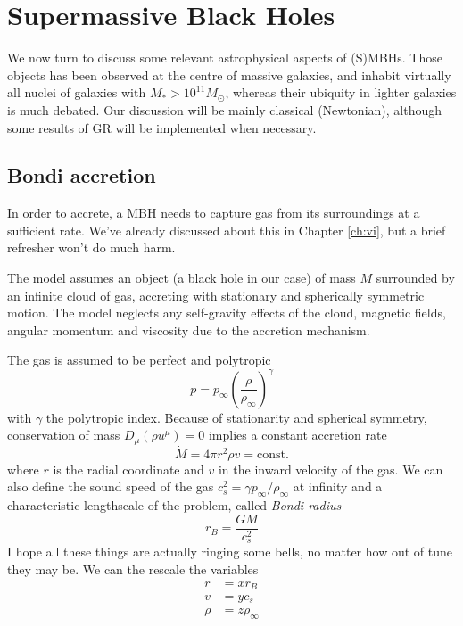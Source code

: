\section{Supermassive Black Holes}
We now turn to discuss some relevant astrophysical aspects of (S)MBHs. Those objects has been observed at the centre of massive galaxies, and inhabit virtually all nuclei of galaxies with $M_{*} > 10^{11}M_{\odot}$, whereas their ubiquity in lighter galaxies is much debated. Our discussion will be mainly classical (Newtonian), although some results of GR will be implemented when necessary.
\subsection{Bondi accretion}
In order to accrete, a MBH needs to capture gas from its surroundings at a suﬃcient rate. We've already discussed about this in Chapter \ref{ch:vi}, but a brief refresher won't do much harm.
\par The model assumes an object (a black hole in our case) of mass $M$ surrounded by an inﬁnite cloud of gas, accreting with stationary and spherically
symmetric motion. The model neglects any self-gravity eﬀects of the cloud, magnetic ﬁelds, angular momentum and viscosity due to the accretion mechanism.
\par The gas is assumed to be perfect and polytropic
\begin{equation*}
    p = p_{\infty}\left(\frac{\rho}{\rho_{\infty}}\right)^{\gamma}
\end{equation*}
with $\gamma$ the polytropic index. Because of stationarity and spherical symmetry, conservation of mass $D_{\mu}(\rho u^{\mu}) = 0$ implies a constant accretion rate
\begin{equation*}
    \dot{M} = 4\pi r^{2}\rho v = \text{const.}
\end{equation*}
where $r$ is the radial coordinate and $v$ in the inward velocity of the gas. We can also define the sound speed of the gas $c^{2}_{s} = \gamma p_{\infty}/\rho_{\infty}$ at infinity and a characteristic lengthscale of the problem, called \emph{Bondi radius}
\begin{equation*}
    r_{B} = \frac{GM}{c^{2}_{s}}
\end{equation*}
I hope all these things are actually ringing some bells, no matter how out of tune they may be. We can the rescale the variables
\begin{align*}
    r &= xr_{B}\\
    v &= yc_{s}\\
    \rho &= z\rho_{\infty}
\end{align*}
